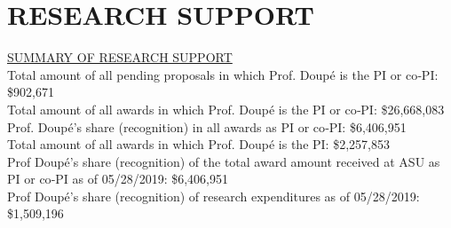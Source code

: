 \documentclass[11pt,letterpaper,sans]{moderncv}
\begin{document}


\section{RESEARCH SUPPORT}

\begin{framed}
  \underline{SUMMARY OF RESEARCH SUPPORT} \\
  Total amount of all pending proposals in which Prof. Doup\'e is the PI or co‐PI: \$902,671 \\
  Total amount of all awards in which Prof. Doup\'e is the PI or co‐PI: \$26,668,083  \\
  Prof. Doup\'e's share (recognition) in all awards as PI or co‐PI: \$6,406,951  \\
  Total amount of all awards in which Prof. Doup\'e is the PI: \$2,257,853  \\
  Prof Doup\'e's share (recognition) of the total award amount received at ASU as PI or co‐PI as of 05/28/2019: \$6,406,951 \\
  Prof Doup\'e's share (recognition) of research expenditures as of 05/28/2019: \$1,509,196 \\
\end{framed}
\end{document}
